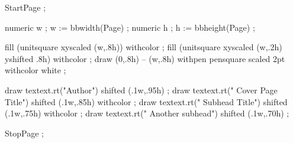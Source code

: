 
\startMPpage

    StartPage ;

    numeric w ; w := bbwidth(Page) ;
    numeric h ; h := bbheight(Page) ;

    fill (unitsquare xyscaled (w,.8h)) withcolor  ;
    fill (unitsquare xyscaled (w,.2h) yshifted .8h) withcolor  ;
    draw (0,.8h) -- (w,.8h) withpen pensquare scaled 2pt withcolor white ;

    draw textext.rt("Author") shifted (.1w,.95h) ;
    draw textext.rt(" Cover Page Title") shifted (.1w,.85h) withcolor  ;
    draw textext.rt(" Subhead Title") shifted (.1w,.75h) withcolor  ;
    draw textext.rt(" Another subhead") shifted (.1w,.70h) ;



    StopPage ;

\stopMPpage


